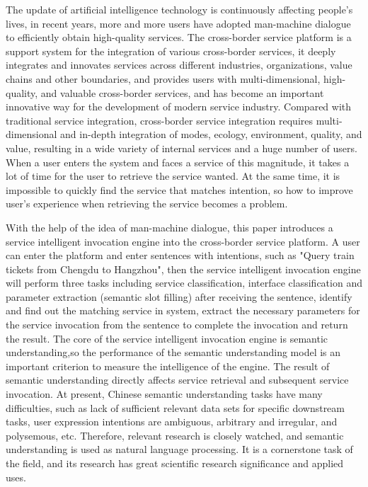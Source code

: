 \begin{englishabstract}
The update of artificial intelligence technology is continuously affecting people's lives,
in recent years, more and more users have adopted man-machine dialogue to efficiently obtain high-quality services. 
The cross-border service platform is a support system for the integration of various cross-border services,
it deeply integrates and innovates services across different industries, organizations, value chains and other boundaries, 
and provides users with multi-dimensional, high-quality, and valuable cross-border services, 
and has become an important innovative way for the development of modern service industry. 
Compared with traditional service integration, cross-border service integration requires multi-dimensional 
and in-depth integration of modes, ecology, environment, quality, and value, 
resulting in a wide variety of internal services and a huge number of users. 
When a user enters the system and faces a service of this magnitude, it takes a lot of time for the user to retrieve the service wanted.
At the same time, it is impossible to quickly find the service that matches intention, 
so how to improve user's experience when retrieving the service becomes a problem.

With the help of the idea of ​​man-machine dialogue, this paper introduces a service intelligent invocation engine into the cross-border service platform. 
A user can enter the platform and enter sentences with intentions, such as "Query train tickets from Chengdu to Hangzhou",
then the service intelligent invocation engine will perform three tasks including service classification, interface classification 
and parameter extraction (semantic slot filling) after receiving the sentence,
identify and find out the matching service in system, extract the necessary parameters for the service invocation from the sentence to 
complete the invocation and return the result.
The core of the service intelligent invocation engine is semantic understanding,so the performance of the semantic understanding model
is an important criterion to measure the intelligence of the engine. The result of semantic understanding directly 
affects service retrieval and subsequent service invocation. At present, Chinese semantic understanding tasks have many difficulties, 
such as lack of sufficient relevant data sets for specific downstream tasks, user expression intentions are ambiguous, arbitrary and irregular, 
and polysemous, etc. Therefore, relevant research is closely watched, and semantic understanding is used as natural language processing. 
It is a cornerstone task of the field, and its research has great scientific research significance and applied uses. 


\end{englishabstract}
